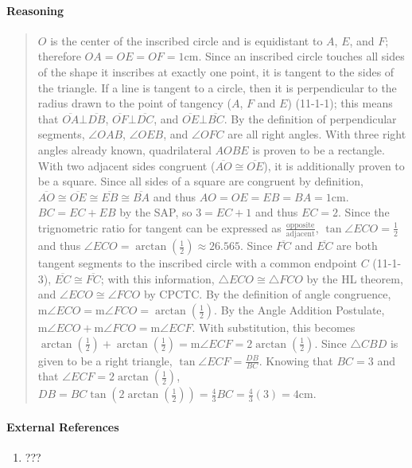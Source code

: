 \documentclass[letterpaper,12pt,twoside]{report}
\begin{document}
	\paragraph{Reasoning}
	\begin{quotation}
		
		$O$ is the center of the inscribed circle and is equidistant to $A$, $E$, and $F$; therefore $OA=OE=OF=1 \text{cm}$. Since an inscribed circle touches all sides of the shape it inscribes at exactly one point, it is tangent to the sides of the triangle. If a line is tangent to a circle, then it is perpendicular to the radius drawn to the point of tangency ($A$, $F$ and $E$) (11-1-1); this means that $\overline{OA} \bot \overline{DB}$, $\overline{OF} \bot \overline{DC}$, and $\overline{OE} \bot \overline{BC}$. By the definition of perpendicular segments, $\angle OAB$, $\angle OEB$, and $\angle OFC$ are all right angles. With three right angles already known, quadrilateral $AOBE$ is proven to be a rectangle. With two adjacent sides congruent ($\overline{AO} \cong \overline{OE}$), it is additionally proven to be a square. Since all sides of a square are congruent by definition, $\overline{AO}\cong \overline{OE}\cong \overline{EB}\cong \overline{BA}$ and thus $AO=OE=EB=BA=1 \text{cm}$. $BC=EC+EB$ by the SAP, so $3=EC+1$ and thus $EC=2$. Since the trignometric ratio for tangent can be expressed as $\frac{\text{opposite}}{\text{adjacent}}$, $\tan \angle ECO = \frac{1}{2}$ and thus $\angle ECO=\arctan (\frac{1}{2}) \approx 26.565$\textdegree. Since $\overline{FC}$ and $\overline{EC}$ are both tangent segments to the inscribed circle with a common endpoint $C$ (11-1-3), $\overline{EC}\cong \overline{FC}$; with this information, $\triangle ECO \cong \triangle FCO$ by the HL theorem, and $\angle ECO \cong \angle FCO$ by CPCTC. By the definition of angle congruence, $\text{m}\angle ECO = \text{m}\angle FCO = \arctan (\frac{1}{2}) $. By the Angle Addition Postulate, $\text{m}\angle ECO+\text{m}\angle FCO=\text{m}\angle ECF$. With substitution, this becomes $\arctan (\frac{1}{2}) + \arctan (\frac{1}{2}) = \text{m}\angle ECF=2\arctan (\frac{1}{2})$. Since $\triangle CBD$ is given to be a right triangle, $\tan \angle ECF = \frac{DB}{BC}$. Knowing that $BC=3$ and that $\angle ECF=2\arctan (\frac{1}{2})$, $DB=BC \tan (2 \arctan (\frac{1}{2}))=\frac{4}{3}BC=\frac{4}{3}(3)=\boxed{4 \text{cm}}$. 
		
	\end{quotation}
	
	\paragraph{External References}
	
	\begin{enumerate}
		\item ???
	\end{enumerate}
	
\end{document}

